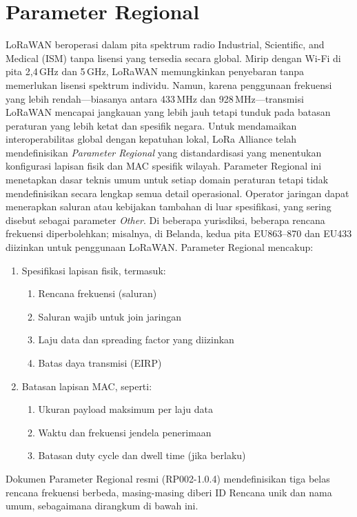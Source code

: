 \section{Parameter Regional}
LoRaWAN beroperasi dalam pita spektrum radio Industrial, Scientific, and Medical (ISM) tanpa lisensi yang tersedia secara global. Mirip dengan Wi-Fi di pita 2,4\,GHz dan 5\,GHz, LoRaWAN memungkinkan penyebaran tanpa memerlukan lisensi spektrum individu. Namun, karena penggunaan frekuensi yang lebih rendah—biasanya antara 433\,MHz dan 928\,MHz—transmisi LoRaWAN mencapai jangkauan yang lebih jauh tetapi tunduk pada batasan peraturan yang lebih ketat dan spesifik negara. Untuk mendamaikan interoperabilitas global dengan kepatuhan lokal, LoRa Alliance telah mendefinisikan \emph{Parameter Regional} yang distandardisasi yang menentukan konfigurasi lapisan fisik dan MAC spesifik wilayah.
Parameter Regional ini menetapkan dasar teknis umum untuk setiap domain peraturan tetapi tidak mendefinisikan secara lengkap semua detail operasional. Operator jaringan dapat menerapkan saluran atau kebijakan tambahan di luar spesifikasi, yang sering disebut sebagai parameter \emph{Other}. Di beberapa yurisdiksi, beberapa rencana frekuensi diperbolehkan; misalnya, di Belanda, kedua pita EU863–870 dan EU433 diizinkan untuk penggunaan LoRaWAN.
Parameter Regional mencakup:
\begin{enumerate}
    \item Spesifikasi lapisan fisik, termasuk:
          \begin{enumerate}
              \item Rencana frekuensi (saluran)
              \item Saluran wajib untuk join jaringan
              \item Laju data dan spreading factor yang diizinkan
              \item Batas daya transmisi (EIRP)
          \end{enumerate}
    \item Batasan lapisan MAC, seperti:
          \begin{enumerate}
              \item Ukuran payload maksimum per laju data
              \item Waktu dan frekuensi jendela penerimaan
              \item Batasan duty cycle dan dwell time (jika berlaku)
          \end{enumerate}
\end{enumerate}
Dokumen Parameter Regional resmi (RP002-1.0.4) mendefinisikan tiga belas rencana frekuensi berbeda, masing-masing diberi ID Rencana unik dan nama umum, sebagaimana dirangkum di bawah ini.
